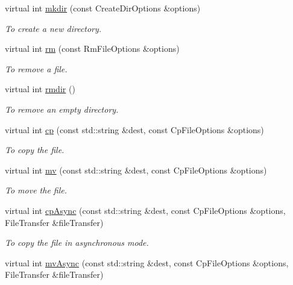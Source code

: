 \begin{DoxyCompactItemize}
virtual int \hyperlink{classLocalFileProxy_a7a679a1450918251354799aebd92e1d5}{mkdir} (const CreateDirOptions \&options)
\begin{DoxyCompactList}\small\item\em To create a new directory. \item\end{DoxyCompactList}\item 
virtual int \hyperlink{classLocalFileProxy_a547344b53a3220ef9dbb09a7b60abfb6}{rm} (const RmFileOptions \&options)
\begin{DoxyCompactList}\small\item\em To remove a file. \item\end{DoxyCompactList}\item 
virtual int \hyperlink{classLocalFileProxy_a1050955fb8fbe8ff11d2241d3fb66766}{rmdir} ()
\begin{DoxyCompactList}\small\item\em To remove an empty directory. \item\end{DoxyCompactList}\item 
virtual int \hyperlink{classLocalFileProxy_a262f742c0188d1eccd0eb16a2eca72b8}{cp} (const std::string \&dest, const CpFileOptions \&options)
\begin{DoxyCompactList}\small\item\em To copy the file. \item\end{DoxyCompactList}\item 
virtual int \hyperlink{classLocalFileProxy_a698df970e4fdc3fd9b7815fc336eea28}{mv} (const std::string \&dest, const CpFileOptions \&options)
\begin{DoxyCompactList}\small\item\em To move the file. \item\end{DoxyCompactList}\item 
virtual int \hyperlink{classLocalFileProxy_a8edb18eefdde2d0daea34aca515579fb}{cpAsync} (const std::string \&dest, const CpFileOptions \&options, FileTransfer \&fileTransfer)
\begin{DoxyCompactList}\small\item\em To copy the file in asynchronous mode. \item\end{DoxyCompactList}\item 
virtual int \hyperlink{classLocalFileProxy_a66e35fcf3ec9531fd4b085d242d2c9c9}{mvAsync} (const std::string \&dest, const CpFileOptions \&options, FileTransfer \&fileTransfer)

\end{DoxyCompactItemize}
